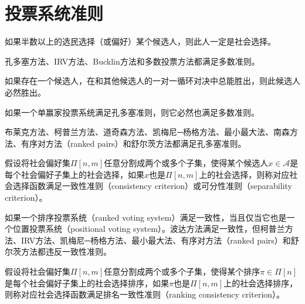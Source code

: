 \section{投票系统准则}
\begin{definition}[多数准则]
如果半数以上的选民选择（或偏好）某个候选人，则此人一定是社会选择。
\end{definition}

\begin{corollary}
孔多塞方法、IRV方法、Bucklin方法和多数投票方法都满足多数准则。
\end{corollary}

\begin{definition}[孔多塞准则]
如果存在一个候选人，在和其他候选人的一对一循环对决中总能胜出，则此候选人必然胜出。
\end{definition}

\begin{corollary}
如果一个单赢家投票系统满足孔多塞准则，则它必然也满足多数准则。
\end{corollary}

\begin{corollary}
布莱克方法、柯普兰方法、道奇森方法、凯梅尼─杨格方法、最小最大法、南森方法、有序对方法（ranked pairs）和舒尔茨方法都满足孔多塞准则。
\end{corollary}

\begin{definition}[一致性准则]
假设将社会偏好集$\Pi[n,m]$任意分割成两个或多个子集，使得某个候选人$x\in \mathcal A$是每个社会偏好子集上的社会选择，如果$x$也是$\Pi[n,m]$上的社会选择，则称对应社会选择函数满足一致性准则（consistency criterion）或可分性准则（separability criterion）。
\end{definition}

\begin{corollary}
如果一个排序投票系统（ranked voting system）满足一致性，当且仅当它也是一个位置投票系统（positional voting system）。波达方法满足一致性，但柯普兰方法、IRV方法、凯梅尼─杨格方法、最小最大法、有序对方法（ranked pairs）和舒尔茨方法都违反一致性准则。
\end{corollary}

\begin{definition}[排名一致性准则]
假设将社会偏好集$\Pi[n,m]$任意分割成两个或多个子集，使得某个排序$\pi\in \Pi[n]$是每个社会偏好子集上的社会选择排序，如果$\pi$也是$\Pi[n,m]$上的社会选择排序，则称对应社会选择函数满足排名一致性准则（ranking consistency criterion）。
\end{definition}

